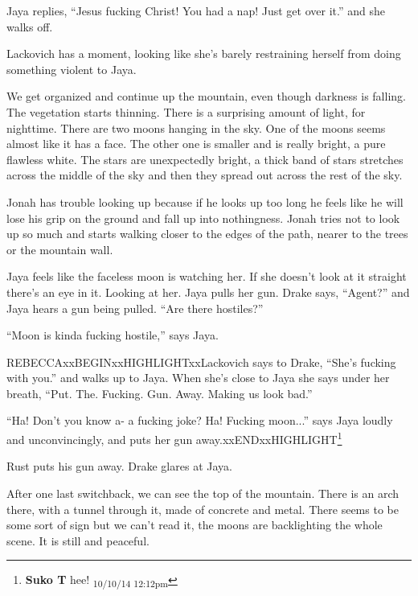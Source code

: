 Jaya replies, ``Jesus fucking Christ!  You had a nap!  Just get over it.'' and she walks off.

Lackovich has a moment, looking like she's barely restraining herself from doing something violent to Jaya.  





We get organized and continue up the mountain, even though darkness is falling.  The vegetation starts thinning.  There is a surprising amount of light, for nighttime.  There are two moons hanging in the sky.  One of the moons seems almost like it has a face.  The other one is smaller and is really bright, a pure flawless white.   The stars are unexpectedly bright, a thick band of stars stretches across the middle of the sky and then they spread out across the rest of the sky.



Jonah has trouble looking up because if he looks up too long he feels like he will lose his grip on the ground and fall up into nothingness.  Jonah tries not to look up so much and starts walking closer to the edges of the path, nearer to the trees or the mountain wall.



Jaya feels like the faceless moon is watching her.  If she doesn't look at it straight there's an eye in it.  Looking at her.  Jaya pulls her gun.  Drake says, ``Agent?'' and Jaya hears a gun being pulled.  ``Are there hostiles?''

``Moon is kinda fucking hostile,'' says Jaya.

REBECCAxxBEGINxxHIGHLIGHTxxLackovich says to Drake, ``She's fucking with you.'' and walks up to Jaya.  When she's close to Jaya she says under her breath, ``Put. The.  Fucking.  Gun.  Away.  Making us look bad.''

``Ha!  Don't you know a- a fucking joke?  Ha!  Fucking moon...'' says Jaya loudly and unconvincingly, and puts her gun away.xxENDxxHIGHLIGHT\footnote{\textbf{Suko T }hee! \textsubscript{10/10/14 12:12pm}}

Rust puts his gun away.  Drake glares at Jaya.



After one last switchback, we can see the top of the mountain.  There is an arch there, with a tunnel through it, made of concrete and metal.  There seems to be some sort of sign but we can't read it, the moons are backlighting the whole scene.  It is still and peaceful.


